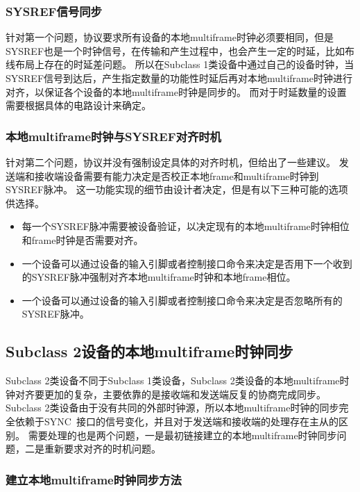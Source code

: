 \documentclass[UTF8]{ctexart}
\begin{document}
\subsubsection{SYSREF信号同步}

针对第一个问题，协议要求所有设备的本地multiframe时钟必须要相同，但是SYSREF也是一个时钟信号，在传输和产生过程中，也会产生一定的时延，比如布线布局上存在的时延差问题。
所以在Subclass 1类设备中通过自己的设备时钟，当SYSREF信号到达后，产生指定数量的功能性时延后再对本地multiframe时钟进行对齐，以保证各个设备的本地multiframe时钟是同步的。
而对于时延数量的设置需要根据具体的电路设计来确定。

\subsubsection{本地multiframe时钟与SYSREF对齐时机}

针对第二个问题，协议并没有强制设定具体的对齐时机，但给出了一些建议。
发送端和接收端设备需要有能力决定是否校正本地frame和multiframe时钟到SYSREF脉冲。
这一功能实现的细节由设计者决定，但是有以下三种可能的选项供选择。

\begin{itemize}
\item 每一个SYSREF脉冲需要被设备验证，以决定现有的本地multiframe时钟相位和frame时钟是否需要对齐。
\item 一个设备可以通过设备的输入引脚或者控制接口命令来决定是否用下一个收到的SYSREF脉冲强制对齐本地multiframe时钟和本地frame相位。
\item 一个设备可以通过设备的输入引脚或者控制接口命令来决定是否忽略所有的SYSREF脉冲。
\end{itemize}

\subsection{Subclass 2设备的本地multiframe时钟同步}

Subclass 2类设备不同于Subclass 1类设备，Subclass 2类设备的本地multiframe时钟对齐要更加的复杂，主要依靠的是接收端和发送端反复的协商完成同步。
Subclass 2类设备由于没有共同的外部时钟源，所以本地multiframe时钟的同步完全依赖于SYNC~接口的信号变化，并且对于发送端和接收端的处理存在主从的区别。
需要处理的也是两个问题，一是最初链接建立的本地multiframe时钟同步问题，二是重新要求对齐的时机问题。

\subsubsection{建立本地multiframe时钟同步方法}
\end{document}
